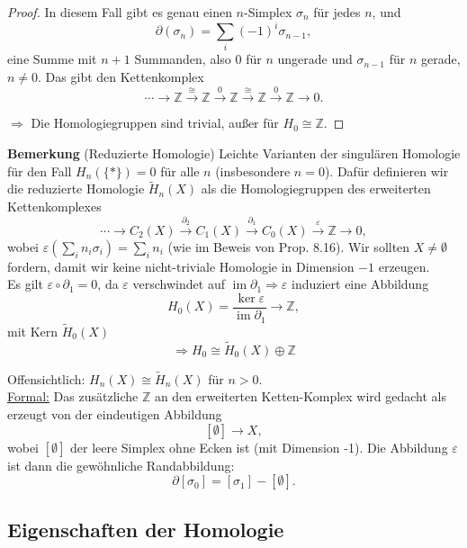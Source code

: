 \documentclass[fleqn, 12pt, letterpaper]{article}
\begin{document}
\begin{proof}
In diesem Fall gibt es genau einen $n$-Simplex $\sigma_n$ für jedes $n$, und 
\[
\partial(\sigma_n) = \sum_i (-1)^i \sigma_{n-1},
\]
eine Summe mit $n+1$ Summanden, also 0 für $n$ ungerade und $\sigma_{n-1}$ für $n$ gerade, $n \ne 0$. Das gibt den Kettenkomplex
\[
\cdots \longrightarrow \mathbb{Z} \xrightarrow{\cong} \mathbb{Z} \xrightarrow{0} \mathbb{Z} \xrightarrow{\cong} \mathbb{Z} \xrightarrow{0}\mathbb{Z}\to 0.
\]

$\Rightarrow$ Die Homologiegruppen sind trivial, außer für $H_0 \cong \mathbb{Z}$.
\end{proof}

\textbf{Bemerkung} (Reduzierte Homologie) Leichte Varianten der singulären Homologie für den Fall $H_n(\{*\}) = 0$ für alle $n$ (insbesondere $n = 0$). Dafür definieren wir die reduzierte Homologie $\tilde{H}_n(X)$ als die Homologiegruppen des erweiterten Kettenkomplexes
\[
\cdots \longrightarrow C_2(X) \xrightarrow{\partial_2} C_1(X) \xrightarrow{\partial_1} C_0(X) \xrightarrow{\varepsilon} \mathbb{Z} \longrightarrow 0,
\]
wobei $\varepsilon\left( \sum_i n_i \sigma_i \right) = \sum_i n_i$ (wie im Beweis von Prop. 8.16). Wir sollten $X \neq \emptyset$ fordern, damit wir keine nicht-triviale Homologie in Dimension $-1$ erzeugen.\\

Es gilt $\varepsilon \circ \partial_1 = 0$, da $\varepsilon$ verschwindet auf $\operatorname{im} \partial_1 \Rightarrow \varepsilon$ induziert eine Abbildung
\[
H_0(X) = \frac{\ker \varepsilon}{\operatorname{im} \partial_1} \longrightarrow \mathbb{Z},
\]
mit Kern $\tilde{H}_0(X)$ 
\[\Rightarrow H_0 \cong \tilde{H}_0(X) \oplus \mathbb{Z}\]

Offensichtlich: $H_n(X) \cong \tilde{H}_n(X)$ für $n > 0$.\\

\underline{Formal:} Das zusätzliche $\mathbb{Z}$ an den erweiterten Ketten-Komplex wird gedacht als erzeugt von der eindeutigen Abbildung
\[
[\emptyset] \longrightarrow X,
\]
wobei $[\emptyset]$ der leere Simplex ohne Ecken ist (mit Dimension -1). Die Abbildung $\varepsilon$ ist dann die gewöhnliche Randabbildung:
\[
\partial[\sigma_0] = [\sigma_1] - [\emptyset].
\]


\subsection{Eigenschaften der Homologie}
\end{document}
